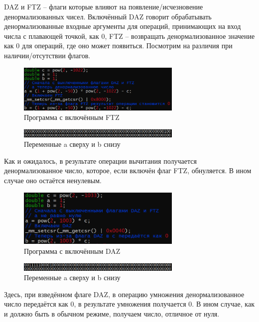 \documentclass[a4paper,12pt]{article}
\begin{document}
DAZ и FTZ -- флаги которые влияют на появление/исчезновение денормализованных чисел. Включённый DAZ говорит обрабатывать денормализованные входные аргументы для операций, принимающих на вход числа с плавающей точкой, как 0, FTZ -- возвращать денормализованное значение как 0 для операций, где оно может появиться. Посмотрим на различия при наличии/отсутствии флагов.
\begin{figure}[H]\label{fig: FTZ code}
    \centering
    \includegraphics[width = 0.7\textwidth]{FTZ код.png}
    \caption{Программа с включённым FTZ}
\end{figure}
\begin{figure}[H]\label{fig: FTZ result}
    \centering
    \includegraphics[width = 0.7\textwidth]{FTZ результат работы.png}
    \caption{Переменные a сверху и b снизу}
\end{figure}
Как и ожидалось, в результате операции вычитания получается денормализованное число, которое, если включён флаг FTZ, обнуляется. В ином случае оно остаётся ненулевым. 

\begin{figure}[H]\label{fig: DAZ code}
    \centering
    \includegraphics[width = 0.7\textwidth]{DAZ код.png}
    \caption{Программа с включённым DAZ}
\end{figure}
\begin{figure}[H]\label{fig: DAZ result}
    \centering
    \includegraphics[width = 0.7\textwidth]{DAZ результат работы.png}
    \caption{Переменные a сверху и b снизу}
\end{figure}
Здесь, при взведённом флаге DAZ, в операцию умножения денормализованное число передаётся как 0, в результате умножения получается 0. В ином случае, как и должно быть в обычном режиме, получаем число, отличное от нуля. 
\end{document}
